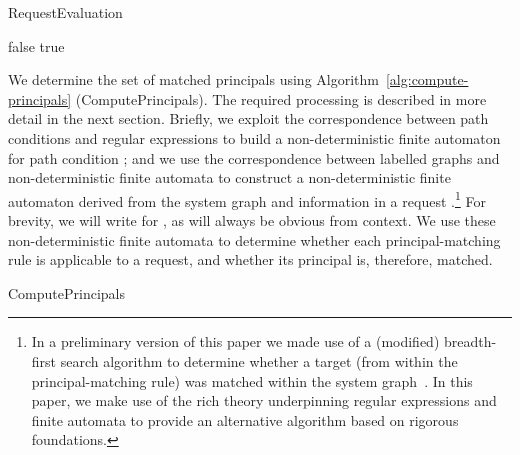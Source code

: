 \documentclass{article}
\begin{document}
\begin{algorithm}[t]
\footnotesize
    \caption{\textsf{RequestEvaluation}}
    \label{alg:request-eval}
    \begin{algorithmic}[1]
            \IF{}
            \ELSE
                \IF{}
                \ELSIF{}
                    \RETURN false 
                \ELSIF{}
                    \RETURN true 
                \ENDIF
            \ENDIF
    \end{algorithmic}
\end{algorithm}

We determine the set of matched principals using Algorithm~\ref{alg:compute-principals} (\textsf{ComputePrincipals}).
The required processing is described in more detail in the next section.
Briefly, we exploit the correspondence between path conditions and regular expressions to build a non-deterministic finite automaton  for path condition ; and we use the correspondence between labelled graphs and non-deterministic finite automata to construct a non-deterministic finite automaton  derived from the system graph  and information in a request .\footnote{In a preliminary version of this paper we made use of a (modified) breadth-first search algorithm to determine whether a target (from within the principal-matching rule) was matched within the system graph~\cite{CramptonS14}.  In this paper, we make use of the rich theory underpinning regular expressions and finite automata to provide an alternative algorithm based on rigorous foundations.}
For brevity, we will write  for , as  will always be obvious from context.
We use these non-deterministic finite automata to determine whether each principal-matching rule is applicable to a request, and whether its principal is, therefore, matched.

\begin{algorithm}[t]
\footnotesize
    \caption{\textsf{ComputePrincipals}}
    \label{alg:compute-principals}
    \begin{algorithmic}[1]
            \STATE{}
            \STATE{}
            \FOR{} \IF{) \OR }
                            \IF{() \OR }
                                \STATE{}
                            \ENDIF
                        \ENDIF
            \ENDFOR
    \end{algorithmic}
\end{algorithm}
\end{document}
